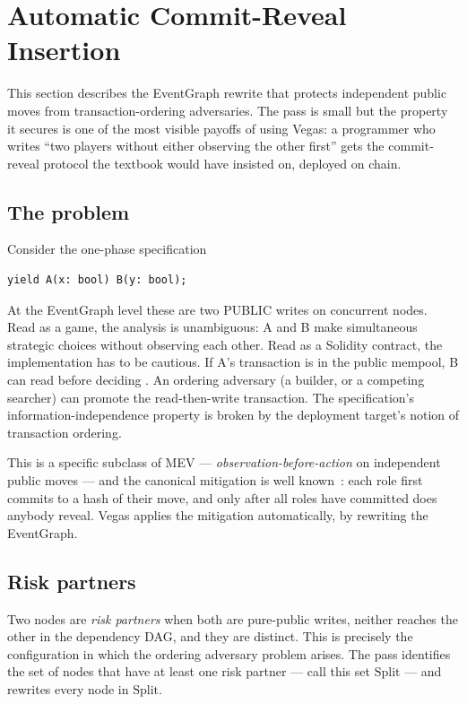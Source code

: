 \section{Automatic Commit-Reveal Insertion}
\label{sec:commit-reveal}

This section describes the EventGraph rewrite that protects
independent public moves from transaction-ordering adversaries.
The pass is small but the property it secures is one of the most
visible payoffs of using Vegas: a programmer who writes
``two players  without either observing the other first''
gets the commit-reveal protocol the textbook would have insisted
on, deployed on chain.

\subsection{The problem}
\label{sec:cr:problem}

Consider the one-phase specification
\begin{lstlisting}[style=vg]
yield A(x: bool) B(y: bool);
\end{lstlisting}
At the EventGraph level these are two PUBLIC writes on concurrent
nodes.  Read as a game, the analysis is unambiguous: A and B make
simultaneous strategic choices without observing each other.  Read
as a Solidity contract, the implementation has to be cautious.  If A's
transaction is in the public mempool, B can read  before
deciding .  An ordering adversary (a builder, or a competing
searcher) can promote the read-then-write transaction.  The
specification's information-independence property is broken by the
deployment target's notion of transaction ordering.

This is a specific subclass of MEV --- \emph{observation-before-action}
on independent public moves --- and the canonical mitigation is well
known~\citep{Blum1983CoinFlipping,Pedersen1991Commitment,breidenbach2018enter}:
each role first commits to a hash of their move, and only after
all roles have committed does anybody reveal.  Vegas applies the
mitigation automatically, by rewriting the EventGraph.

\subsection{Risk partners}

Two nodes are \emph{risk partners} when both are pure-public
writes, neither reaches the other in the dependency DAG, and they
are distinct.  This is precisely the configuration in which the
ordering adversary problem arises.  The pass identifies the set
of nodes that have at least one risk partner --- call this set
$\mathrm{Split}$ --- and rewrites every node in $\mathrm{Split}$.

